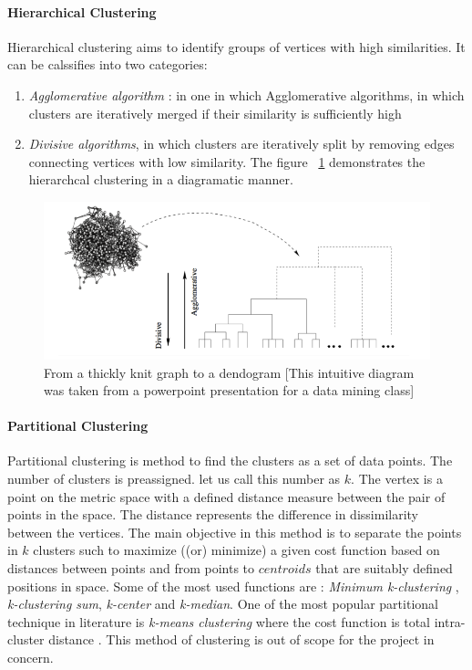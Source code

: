 \paragraph{Hierarchical Clustering}
Hierarchical clustering aims to identify groups of vertices with high similarities. It can be calssifies into two categories:
 \begin{enumerate}
\item \textit{Agglomerative algorithm} : in one in which Agglomerative algorithms, in which clusters are iteratively merged if their similarity is sufficiently
high
\item \textit{Divisive algorithms}, in which clusters are iteratively
split by removing edges connecting vertices with
low similarity.
The figure ~\ref{herar} demonstrates the hierarchcal clustering in a diagramatic manner.
\end{enumerate} 

\begin{figure}[H]
\centering
\includegraphics[scale=0.5]{hirac.png}
\caption{\label{herar}From a thickly knit graph to a dendogram [This intuitive diagram was taken from a powerpoint presentation for a data mining class]}
\end{figure}
\paragraph{Partitional Clustering}
Partitional clustering is method to find the clusters as a set of data points.  The number of clusters is preassigned. let us call this number as $k$. The vertex is a point on the metric space with a defined distance measure between the pair of points in the space.  The distance represents the difference in dissimilarity between the vertices. The main objective in this method is to separate the points in $k$ clusters such to maximize ((or) minimize) a given cost function based on distances between points and from points to $centroids$ that are suitably defined positions in space. 
Some of the most used functions are : \textit{Minimum k-clustering} ,  \textit{k-clustering sum}, \textit{k-center} and \textit{k-median}. One of the most popular partitional technique in literature is \textit{k-means clustering} where the cost function is total intra-cluster distance \cite{communitypaper}. This method of clustering is out of scope for the project in concern.
